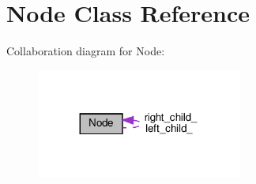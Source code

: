 \hypertarget{classNode}{}\section{Node Class Reference}
\label{classNode}


Collaboration diagram for Node\+:
\nopagebreak
\begin{figure}[H]
\begin{center}
\leavevmode
\includegraphics[width=191pt]{classNode__coll__graph}
\end{center}
\end{figure}
